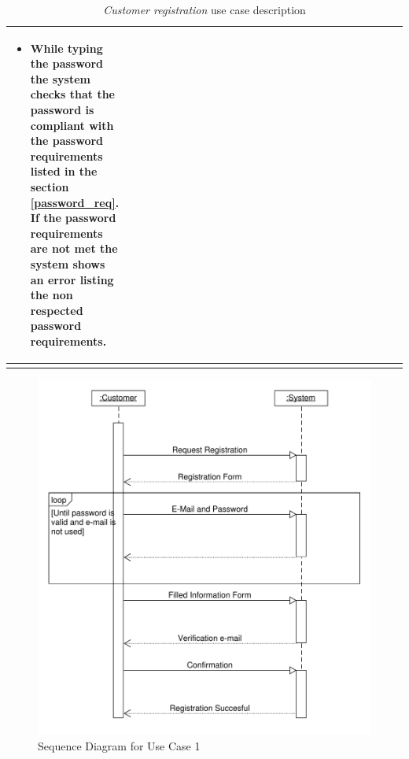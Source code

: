 \begin{longtable}{p{0.25\linewidth}p{0.75\linewidth}}
\begin{itemize}
        \item While typing the password the system checks that the password is compliant with the password requirements listed in the section \ref{password_req}. If the password requirements are not met the system shows an error listing the non respected password requirements.
    \end{itemize}                                                                                                                                   \\
    \bottomrule
    \caption{\emph{Customer registration} use case description}
\end{longtable}

\begin{figure}[H]
    \includegraphics[width=\textwidth]{Images/UML_Seq_Diag_1.pdf}
    \caption{\label{fig:Use_Case_Diag}Sequence Diagram for Use Case 1}
\end{figure}

